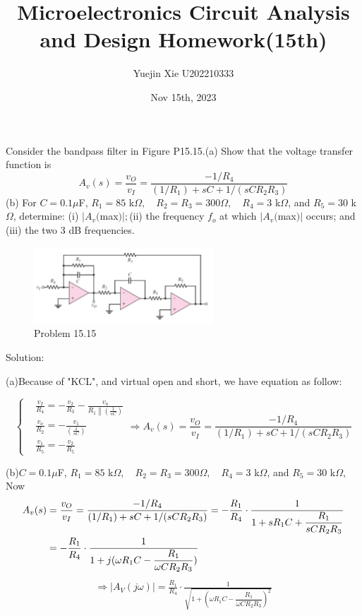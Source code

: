 \documentclass[a4paper,11pt,UTF8]{article}
\title{Microelectronics Circuit Analysis and Design Homework(15th)}
\author{Yuejin Xie \quad U202210333}
\date{Nov 15th, 2023}
\begin{document}
 Consider the bandpass filter in Figure P15.15.(a) Show that the voltage transfer function is
$$
A_v(s)=\frac{v_O}{v_I}=\frac{-1/R_4}{(1/R_1)+sC+1/(sCR_2R_3)}
$$
(b) For $C= 0.1\mu$F, $R_1=85$ k$\Omega,\quad R_2=R_3=300\Omega,\quad R_4=3$ k$\Omega$, and
$R_5=30$ k$\Omega$, determine: (i) $|A_v( $max$) |; $(ii) the frequency $f_o$ at which $|A_v( $max$) |$ occurs; and (iii) the two 3 dB frequencies.


\begin{figure}[H]
	\centering
	\includegraphics[width=0.6\textwidth]{15.15}
	\caption{Problem 15.15}
\end{figure}
\noindent Solution:

(a)Because of "KCL", and virtual open and short, we have equation as follow:

$$\left\{\begin{aligned}
	&\frac{v_I}{R_4} =-\frac{v_{2}}{R_{3}}-\frac{v_{o}}{R_{1}\left\|\left(\frac{1}{sC}\right)\right.}  \\
	&\frac{v_o}{R_2} =-\frac{v_{1}}{\left(\frac1{sC}\right)}  \\
	&\frac{v_{1}}{R_{5}} =-\frac{v_{2}}{R_{5}} 
\end{aligned}\right.\Rightarrow A_v(s)=\frac{v_O}{v_I}=\frac{-1/R_4}{(1/R_1)+sC+1/(sCR_2R_3)}$$

(b)$C= 0.1\mu$F, $R_1=85$ k$\Omega,\quad R_2=R_3=300\Omega,\quad R_4=3$ k$\Omega$, and
$R_5=30$ k$\Omega$, Now
$$\begin{aligned}
	A_v(s)&=\frac{v_O}{v_I}=\frac{-1/R_4}{(1/R_1)+sC+1/(sCR_2R_3)}=-\frac{R_1}{R_4}\cdot\frac{1}{1+sR_1C+\dfrac{R_1}{sCR_2R_3}}\\
	&=-\frac{R_1}{R_4}\cdot\frac{1}{1+j(\omega R_1C-\dfrac{R_1}{\omega CR_2R_3})}
\end{aligned}\\
$$
$$
	 \begin{aligned}\Rightarrow\left|A_{V}(j\omega)\right|=\frac{R_{1}}{R_{4}}\cdot\frac{1}{\sqrt{1+(\omega R_1C-\dfrac{R_1}{\omega CR_2R_3})^2}}\end{aligned}
$$
\end{document}
